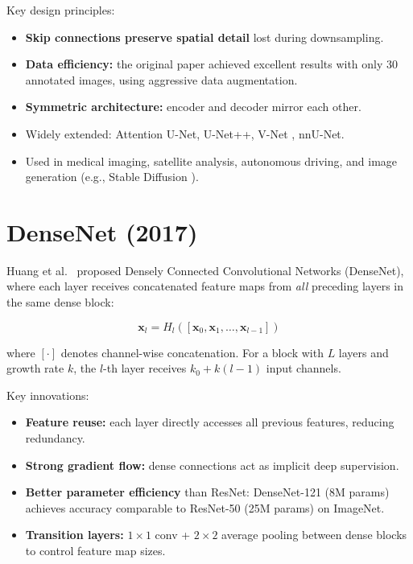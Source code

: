 Key design principles:
\begin{itemize}
    \item \textbf{Skip connections preserve spatial detail} lost during downsampling.
    \item \textbf{Data efficiency:} the original paper achieved excellent results with only 30 annotated images, using aggressive data augmentation.
    \item \textbf{Symmetric architecture:} encoder and decoder mirror each other.
    \item Widely extended: Attention U-Net, U-Net++, V-Net \cite{milletari2016v}, nnU-Net.
    \item Used in medical imaging, satellite analysis, autonomous driving, and image generation (e.g., Stable Diffusion \cite{rombach2022high}).
\end{itemize}

\section{DenseNet (2017)}

Huang et al.\ \cite{huang2017densely} proposed Densely Connected Convolutional Networks (DenseNet), where each layer receives concatenated feature maps from \emph{all} preceding layers in the same dense block:

\begin{equation}
\mathbf{x}_l = H_l\left([\mathbf{x}_0, \mathbf{x}_1, \ldots, \mathbf{x}_{l-1}]\right)
\end{equation}

where $[\cdot]$ denotes channel-wise concatenation. For a block with $L$ layers and growth rate $k$, the $l$-th layer receives $k_0 + k(l-1)$ input channels.

Key innovations:
\begin{itemize}
    \item \textbf{Feature reuse:} each layer directly accesses all previous features, reducing redundancy.
    \item \textbf{Strong gradient flow:} dense connections act as implicit deep supervision.
    \item \textbf{Better parameter efficiency} than ResNet: DenseNet-121 (8M params) achieves accuracy comparable to ResNet-50 (25M params) on ImageNet.
    \item \textbf{Transition layers:} $1\times1$ conv + $2\times2$ average pooling between dense blocks to control feature map sizes.
\end{itemize}

